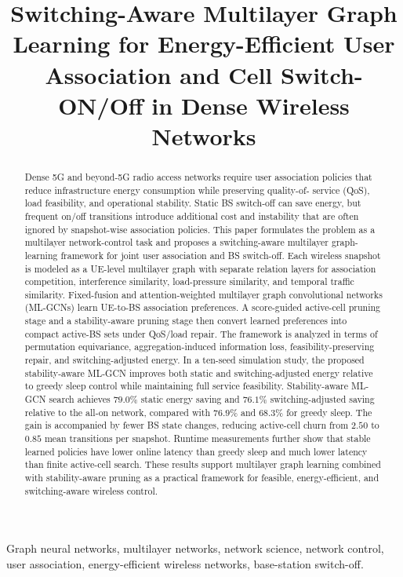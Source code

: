\documentclass[journal]{IEEEtran}
\title{Switching-Aware Multilayer Graph Learning for Energy-Efficient User Association and Cell Switch-ON/Off in Dense Wireless Networks}
\author{}
\begin{document}
\maketitle

\begin{abstract}
Dense 5G and beyond-5G radio access networks require user association policies
that reduce infrastructure energy consumption while preserving quality-of-
service (QoS), load feasibility, and operational stability. Static BS
switch-off can save energy, but frequent on/off transitions introduce
additional cost and instability that are often ignored by snapshot-wise
association policies. This paper formulates the problem as a multilayer
network-control task and proposes a switching-aware multilayer graph-learning
framework for joint user association and BS switch-off. Each wireless snapshot
is modeled as a UE-level multilayer graph with separate relation layers for
association competition, interference similarity, load-pressure similarity,
and temporal traffic similarity. Fixed-fusion and
attention-weighted multilayer graph convolutional networks (ML-GCNs) learn
UE-to-BS association preferences. A score-guided active-cell pruning stage and
a stability-aware pruning stage then convert learned preferences into compact
active-BS sets under QoS/load repair. The framework is analyzed in terms of
permutation equivariance, aggregation-induced information loss,
feasibility-preserving repair, and switching-adjusted energy. In a ten-seed
simulation study, the proposed stability-aware ML-GCN improves both static and
switching-adjusted energy relative to greedy sleep control while maintaining
full service feasibility. Stability-aware ML-GCN search achieves $79.0\%$
static energy saving and $76.1\%$ switching-adjusted saving relative to the
all-on network, compared with $76.9\%$ and $68.3\%$ for greedy sleep. The gain
is accompanied by fewer BS state changes, reducing active-cell churn from
$2.50$ to $0.85$ mean transitions per snapshot. Runtime measurements further show that stable
learned policies have lower online latency than greedy sleep and much lower
latency than finite active-cell search. These results support multilayer graph
learning combined with stability-aware pruning as a practical framework for
feasible, energy-efficient, and switching-aware wireless control.
\end{abstract}

\begin{IEEEkeywords}
Graph neural networks, multilayer networks, network science, network control,
user association, energy-efficient wireless networks, base-station switch-off.
\end{IEEEkeywords}
\end{document}
